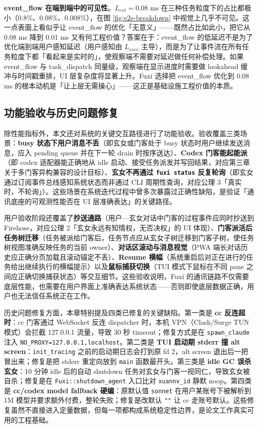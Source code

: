 \textbf{event\_flow 在端到端中的可见性}。$L_{evt} = 0.08$ ms 在三种任务粒度下的占比都极小（0.8\%、0.08\%、0.008\%），在图 \ref{fig:e2e-breakdown} 中视觉上几乎不可见。这一点表面上看似乎让 event\_flow 的优化「无意义」——既然占比如此小，把它从 0.08 ms 降到 0.01 ms 又有何工程价值？答案在于：event\_flow 的低延迟不是为了优化端到端用户感知延迟（用户感知由 $L_{exec}$ 主导），而是为了让事件流在所有任务粒度下都「看起来是实时的」，使观察端不需要对延迟做任何补偿处理。如果 event\_flow 与 task\_dispatch 同量级，观察端在显示进度时需要做 lookahead 缓冲与时间戳重排，UI 层复杂度将显著上升。Fuxi 选择把 event\_flow 优化到 0.08 ms 的根本动机是「让上层无需操心」——这正是基础设施工程价值的本质。

\subsection{功能验收与历史问题修复}

除性能指标外，本文还对系统的关键交互路径进行了功能验收。验收覆盖三类场景：\textbf{busy 状态下用户消息不丢}（即玄女或门客处于 busy 状态时用户继续发送消息，应入 pending queue 并在下一轮 drain 时按序送达）、\textbf{Codex 门客能起能派}（即 codex 适配器能正确地从 idle 启动、接受任务派发并写回结果，对应第三章关于多门客异构兼容的设计目标）、\textbf{玄女不再通过 \texttt{fuxi status} 反复轮询}（即玄女通过订阅事件总线感知系统状态而非通过 CLI 周期性查询，对应公理 3「真实时，不轮询」）。这些场景在系统迭代过程中曾多次暴露过正确性缺陷，是验证「通讯底座的可观测性能否在 UI 层准确表达」的关键路径。

用户验收阶段还覆盖了\textbf{抄送通路}（用户—玄女对话中门客的过程事件应同时抄送到 Firehose，对应公理 2「玄女永远有知情权，无否决权」的 UI 体现）、\textbf{门客派活后任务树迁移}（任务被派给门客后，任务节点应从玄女子树迁移到门客子树，使任务树视图准确反映任务的当前 owner）、\textbf{对话区滚动与消息视觉}（PWA 端长对话历史应正确分页加载且滚动锚定不丢）、\textbf{Resume 横幅}（系统重启后对正在进行的任务给出继续执行的横幅提示）以及\textbf{鼠标捕获切换}（TUI 模式下鼠标在不同 pane 之间应正确切换捕获状态）等交互细节。这些验收说明，Fuxi 的通讯链路不仅需要底层性能，也需要在用户界面上准确表达系统状态——否则即使底层数据正确，用户也无法信任系统正在工作。

历史问题修复方面，本章特别提及四类已修复的关键缺陷。第一类是 \textbf{cc 反连超时}：cc 门客通过 WebSocket 反连 dispatcher 时，本机 VPN（Clash/Surge TUN 模式）会拦截 127.0.0.1 流量，导致 30 秒 timeout；修复方式是在 \texttt{spawn\_claude} 注入 \texttt{NO\_PROXY=127.0.0.1,localhost}。第二类是 \textbf{TUI 启动期 stderr 撞 alt screen}：\texttt{init\_tracing} 之前的启动期日志会打到原 fd 2，alt screen 退出后一把冒出来；修复是把 stderr 重定向放到 \texttt{main} 函数最开头。第三类是 \textbf{idle GC 误杀玄女}：10 分钟 idle 后的自动 shutdown 任务对玄女与门客一视同仁，导致玄女被自杀；修复是在 \texttt{Fuxi::shutdown\_agent} 入口比对 \texttt{xuannv\_id} 静默 noop。第四类是 \textbf{cc/codex model fallback 硬编}：原默认值 \texttt{sonnet} 在用户某账号下被解析到 1M 模型并要求额外付费，整轮失败；修复是改默认 \texttt{""} 让 cc 走账号默认。这些修复虽然不直接进入定量数据，但每一项都构成系统稳定性边界，是论文工作真实可用的工程基础。


